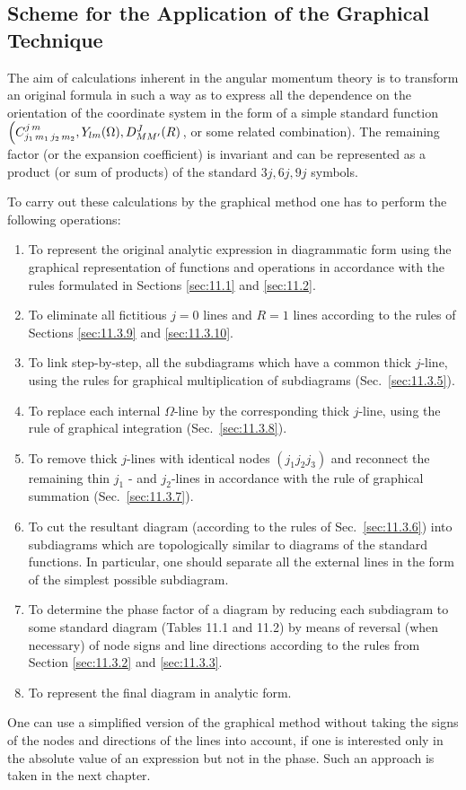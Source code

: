 \subsection{Scheme for the Application of the Graphical Technique}\label{sec:11.4.3}
The aim of calculations inherent in the angular momentum theory is to transform an original formula in such a way as to express all the dependence on the orientation of the coordinate system in the form of a simple standard function \(\left(C_{j_{1}\,m_{1}\,j_{2}\,m_{2}}^{j\,m}, Y_{l m}(\Omega), D_{M M^{\prime}}^{J}(R)\right.\), or some related combination). The remaining factor (or the expansion coefficient) is invariant and can be represented as a product (or sum of products) of the standard \(3 j, 6 j, 9 j\) symbols.

To carry out these calculations by the graphical method one has to perform the following operations:
\begin{enumerate}[label=(\alph*)]
  \item
To represent the original analytic expression in diagrammatic form using the graphical representation of functions and operations in accordance with the rules formulated in Sections \ref{sec:11.1} and \ref{sec:11.2}.
\item To eliminate all fictitious \(j=0\) lines and \(R=1\) lines according to the rules of Sections \ref{sec:11.3.9} and \ref{sec:11.3.10}.\\
\item To link step-by-step, all the subdiagrams which have a common thick \(j\)-line, using the rules for graphical
multiplication of subdiagrams (Sec.~\ref{sec:11.3.5}).
\item To replace each internal \(\Omega\)-line by the corresponding thick \(j\)-line, using the rule of graphical integration (Sec.~\ref{sec:11.3.8}).
\item To remove thick \(j\)-lines with identical nodes \(\left(j_{1} j_{2} j_{3}\right)\) and reconnect the remaining thin \(j_{1}\) - and \(j_{2}\)-lines in accordance with the rule of graphical summation (Sec.~\ref{sec:11.3.7}).
\item To cut the resultant diagram (according to the rules of Sec.~\ref{sec:11.3.6}) into subdiagrams which are topologically similar to diagrams of the standard functions. In particular, one should separate all the external lines in the form of the simplest possible subdiagram.
\item To determine the phase factor of a diagram by reducing each subdiagram to some standard diagram (Tables 11.1 and 11.2) by means of reversal (when necessary) of node signs and line directions according to the rules from Section \ref{sec:11.3.2} and \ref{sec:11.3.3}.
\item To represent the final diagram in analytic form.
\end{enumerate}
One can use a simplified version of the graphical method without taking the signs of the nodes and directions of the lines into account, if one is interested only in the absolute value of an expression but not in the phase.
Such an  approach is taken in the next chapter.